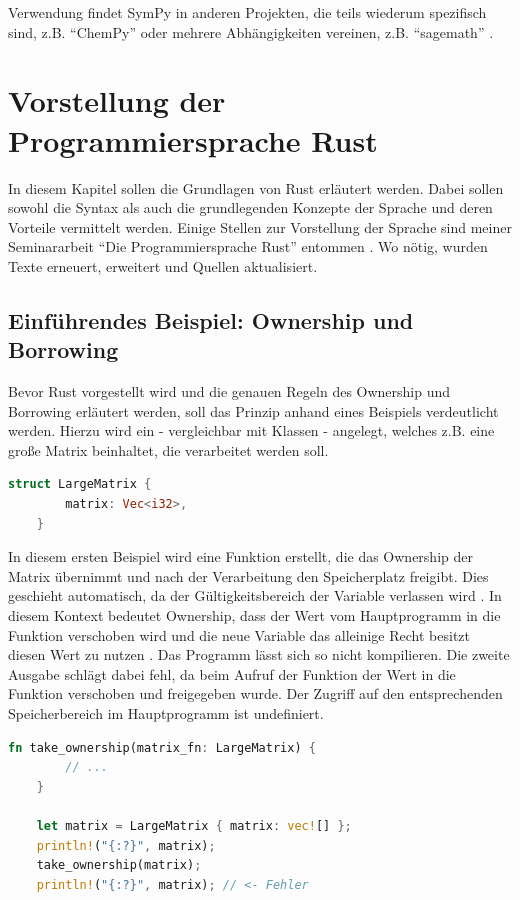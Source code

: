 \documentclass[11pt,a4paper, ngerman]{article}
\begin{document}
Verwendung findet SymPy in anderen Projekten, die teils wiederum spezifisch sind, z.B. ``ChemPy'' \cite{ChemPy} oder mehrere Abhängigkeiten vereinen, z.B. ``sagemath'' \cite {Sagemath}.

\newpage

\section{Vorstellung der Programmiersprache Rust}
In diesem Kapitel sollen die Grundlagen von Rust erläutert werden. Dabei sollen sowohl die Syntax als auch die grundlegenden Konzepte der Sprache und deren Vorteile vermittelt werden. Einige Stellen zur Vorstellung der Sprache sind meiner Seminararbeit ``Die Programmiersprache Rust'' entommen \cite{Seminararbeit}. Wo nötig, wurden Texte erneuert, erweitert und Quellen aktualisiert.

\subsection{Einführendes Beispiel: Ownership und Borrowing}
Bevor Rust vorgestellt wird und die genauen Regeln des Ownership und Borrowing erläutert werden, soll das Prinzip anhand eines Beispiels verdeutlicht werden. Hierzu wird ein  - vergleichbar mit Klassen - angelegt, welches z.B. eine große Matrix beinhaltet, die verarbeitet werden soll.

\begin{lstlisting}[language=rust, caption={Einführendes Beispiel: struct}]
    struct LargeMatrix {
        matrix: Vec<i32>,
    }
\end{lstlisting}

 In diesem ersten Beispiel wird eine Funktion erstellt, die das Ownership der Matrix übernimmt und nach der Verarbeitung den Speicherplatz freigibt. Dies geschieht automatisch, da der Gültigkeitsbereich der Variable  verlassen wird \cite{RustOwnershipFreed}. In diesem Kontext bedeutet Ownership, dass der Wert vom Hauptprogramm in die Funktion verschoben wird und die neue Variable  das alleinige Recht besitzt diesen Wert zu nutzen \cite{RustMovingTerm}. Das Programm lässt sich so nicht kompilieren. Die zweite Ausgabe schlägt dabei fehl, da beim Aufruf der Funktion der Wert in die Funktion verschoben und freigegeben wurde. Der Zugriff auf den entsprechenden Speicherbereich im Hauptprogramm ist undefiniert.

 \begin{lstlisting}[language=rust, caption={Einführendes Beispiel: Ownership abgeben}]
    fn take_ownership(matrix_fn: LargeMatrix) {
        // ...
    }

    let matrix = LargeMatrix { matrix: vec![] };
    println!("{:?}", matrix);
    take_ownership(matrix);
    println!("{:?}", matrix); // <- Fehler
\end{lstlisting}
\end{document}
